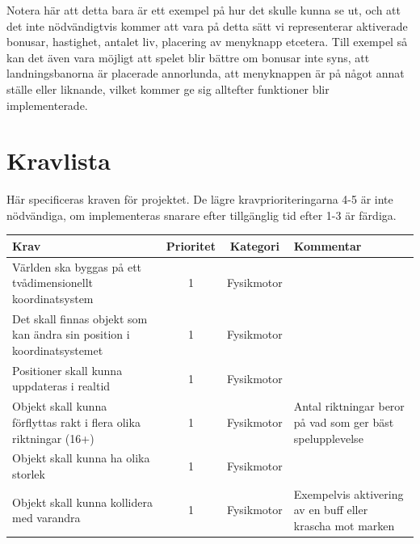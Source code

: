 \documentclass[12pt,a4paper]{article}
\begin{document}
Notera här att detta bara är ett exempel på hur det skulle kunna se ut, och att det inte nödvändigtvis kommer att vara på detta sätt vi representerar aktiverade bonusar, hastighet, antalet liv, placering av menyknapp etcetera. Till exempel så kan det även vara möjligt att spelet blir bättre om bonusar inte syns, att landningsbanorna är placerade annorlunda, att menyknappen är på något annat ställe eller liknande, vilket kommer ge sig alltefter funktioner blir implementerade.


\section{Kravlista}
Här specificeras kraven för projektet. De lägre kravprioriteringarna 4-5 är inte nödvändiga, om implementeras snarare efter tillgänglig tid efter 1-3 är färdiga. 
\begin{longtable}{ | p{3.5cm} | c | c | p{3.5cm} | }
	\hline
	Krav & Prioritet & Kategori & Kommentar  \\ 
	\hline
	Världen ska byggas på ett tvådimensionellt koordinatsystem & 1 & Fysikmotor & \\
	\hline
	Det skall finnas objekt som kan ändra sin position i koordinatsystemet & 1 & Fysikmotor & \\
	\hline
	Positioner skall kunna uppdateras i realtid & 1 & Fysikmotor & \\
	\hline
	Objekt skall kunna förflyttas rakt i flera olika riktningar (16+) & 1 & Fysikmotor & Antal riktningar beror på vad som ger bäst spelupplevelse \\
	\hline	
	Objekt skall kunna ha olika storlek & 1 & Fysikmotor & \\ 
	\hline
	Objekt skall kunna kollidera med varandra & 1 & Fysikmotor & Exempelvis aktivering av en buff eller krascha mot marken \\ \hline
	

\end{longtable}
\end{document}
